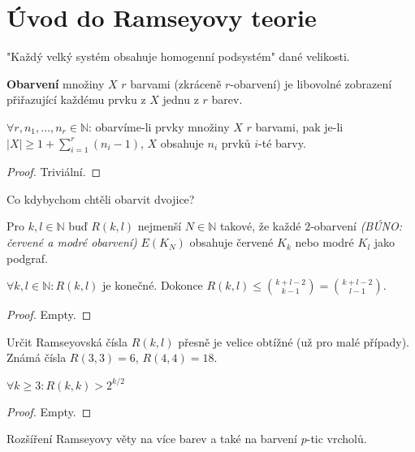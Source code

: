 \chapter{Úvod do Ramseyovy teorie}

"Každý velký systém obsahuje homogenní podsystém" dané velikosti.

\begin{definice}
	\textbf{Obarvení} množiny $X$ $r$ barvami (zkráceně $r$-obarvení) je libovolné zobrazení přiřazující každému prvku z $X$ jednu z $r$ barev.
\end{definice}

\begin{veta}
	$\forall r, n_{1}, \dots , n_{r} \in \mathbb{N}$: obarvíme-li prvky množiny $X$ $r$ barvami, pak je-li $|X| \geq 1+ \sum_{i = 1}^{r}(n_{i} - 1)$, $X$ obsahuje $n_{i}$ prvků $i$-té barvy.
\end{veta}

\begin{proof}
	Triviální.
\end{proof}

Co kdybychom chtěli obarvit dvojice?

\begin{definice}
	Pro $k,l \in \mathbb{N}$ buď $R(k,l)$ nejmenší $N \in \mathbb{N}$ takové, že každé $2$-obarvení \textit{(BÚNO: červené a modré obarvení)} $E(K_{N})$ obsahuje červené $K_{k}$ nebo modré $K_{l}$ jako podgraf.
\end{definice}

\begin{veta}
	$\forall k,l \in \mathbb{N}: R(k,l)$ je konečné. Dokonce $R(k,l) \leq \binom{k+l-2}{k-1} = \binom{k+l-2}{l-1}$.
\end{veta}

\begin{proof}
	Empty.
\end{proof}

Určit Ramseyovská čísla $R(k,l)$ přesně je velice obtížné (už pro malé případy). Známá čísla $R(3,3) = 6$, $R(4,4) = 18$.

\begin{veta}
	$\forall k \geq 3: R(k,k) > 2^{k/2}$
\end{veta}

\begin{proof}
	Empty.
\end{proof}

Rozšíření Ramseyovy věty na více barev a také na barvení $p$-tic vrcholů.

